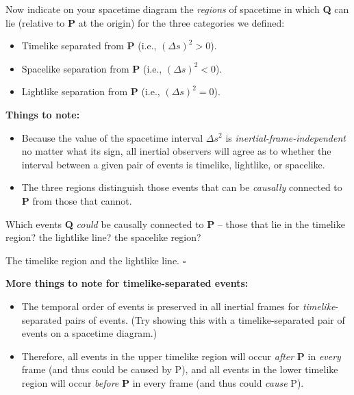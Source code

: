 \documentclass[11pt, letterpaper, openany]{book}
\newenvironment{exercise}[1][Exercise]{%
  \tcolorbox[blanker, breakable, left=1em,
    before skip=1em, after skip=1em,
    borderline west={3pt}{0pt}{PhysNavy},
    colback=PhysCream,
    before upper={\textcolor{PhysNavy}{\sffamily\bfseries #1:}\space}
  ]%
}{%
  \endtcolorbox%
}
\newenvironment{solution}[1][Solution]{%
  \tcolorbox[blanker, breakable, left=1em,
    before skip=1em, after skip=1em,
    borderline west={2pt}{0pt}{PhysTeal},
    colback=PhysCream,
    before upper={\textcolor{PhysTeal}{\sffamily\bfseries #1.}\space}
  ]%
}{%
  \hfill\textcolor{PhysTeal}{\ensuremath{\square}}\endtcolorbox%
}
\begin{document}
Now indicate on your spacetime diagram the \textit{regions} of spacetime in which \textbf{Q} can lie (relative to \textbf{P} at the origin) for the three categories we defined:
\begin{itemize}
    \item \colorbox{yellow!30}{Timelike separated from \textbf{P} (i.e., $(\Delta s)^2 > 0$).}
    \item \colorbox{cyan!20}{Spacelike separation from \textbf{P} (i.e., $(\Delta s)^2 < 0$).}
    \item \colorbox{green!30}{Lightlike separation from \textbf{P} (i.e., $(\Delta s)^2 = 0$).}
\end{itemize}

\textbf{Things to note:}
\begin{itemize}
    \item Because the value of the spacetime interval $\Delta s^2$ is \textit{inertial-frame-independent} no matter what its sign, all inertial observers will agree as to whether the interval between a given pair of events is timelike, lightlike, or spacelike.
    \item The three regions distinguish those events that can be \textit{causally} connected to \textbf{P} from those that cannot.
\end{itemize}

\begin{exercise}[Quick Question]
Which events \textbf{Q} \textit{could} be causally connected to \textbf{P} -- those that lie in the timelike region? the lightlike line? the spacelike region?
\end{exercise}
\begin{solution}
The timelike region and the lightlike line.
\end{solution}

\textbf{More things to note for timelike-separated events:}
\begin{itemize}
    \item The temporal order of events is preserved in all inertial frames for \textit{timelike}-separated pairs of events. (Try showing this with a timelike-separated pair of events on a spacetime diagram.)
    \item Therefore, all events in the upper timelike region will occur \textit{after} \textbf{P} in \textit{every} frame (and thus could be caused by P), and all events in the lower timelike region will occur \textit{before} \textbf{P} in every frame (and thus could \textit{cause} P).
\end{itemize}
\end{document}

